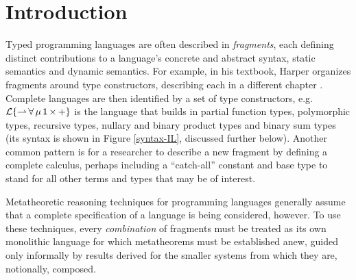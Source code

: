 \documentclass{llncs}
\begin{document}
\section{Introduction}
Typed programming languages are often described in \emph{fragments}, each defining distinct contributions to a language's concrete and abstract syntax, static semantics and dynamic semantics. 
For example, in his textbook, Harper organizes fragments around type constructors, describing each in a different chapter \cite{pfpl}. Complete languages are then identified by a set of type constructors, e.g. $\mathcal{L}\{{\rightharpoonup}\,{\forall}\,{\mu}\,{{\sf 1}}\,{\times}\,{+}\}$ is the language that builds in partial function types,  polymorphic types, recursive types, nullary and binary product types and binary sum types (its syntax is shown in Figure \ref{syntax-IL}, discussed further below).
Another common pattern is for a researcher to describe a new fragment by defining a complete calculus, perhaps including a ``catch-all'' constant and base type to stand for all other terms and types that may be of interest. 

Metatheoretic reasoning techniques for programming languages generally assume that a complete specification of a language is being considered, however. To use these techniques, every \emph{combination} of fragments must be treated as its own monolithic language for which metatheorems must be established anew, guided only informally by results derived for the smaller systems from which they are, notionally, composed.

\end{document}
